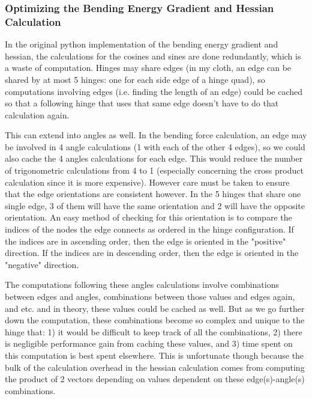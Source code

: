 \documentclass[letterpaper, 10 pt, conference]{ieeeconf}  %
\begin{document}
        \subsubsection{Optimizing the Bending Energy Gradient and Hessian Calculation}
        In the original python implementation of the bending energy gradient and hessian, the calculations for the cosines and sines are done redundantly, which is a waste of computation. Hinges may share edges (in my cloth, an edge can be shared by at most 5 hinges: one for each side edge of a hinge quad), so computations involving edges (i.e. finding the length of an edge) could be cached so that a following hinge that uses that same edge doesn't have to do that calculation again. 

        This can extend into angles as well. In the bending force calculation, an edge may be involved in 4 angle calculations (1 with each of the other 4 edges), so we could also cache the 4 angles calculations for each edge. This would reduce the number of trigonometric calculations from 4 to 1 (especially concerning the cross product calculation since it is more expensive). However care must be taken to ensure that the edge orientations are consistent however. In the 5 hinges that share one single edge, 3 of them will have the same orientation and 2 will have the opposite orientation. An easy method of checking for this orientation is to compare the indices of the nodes the edge connects as ordered in the hinge configuration. If the indices are in ascending order, then the edge is oriented in the "positive" direction. If the indices are in descending order, then the edge is oriented in the "negative" direction.

        The computations following these angles calculations involve combinations between edges and angles, combinations between those values and edges again, and etc. and in theory, these values could be cached as well. But as we go further down the computation, these combinations become so complex and unique to the hinge that: 1) it would be difficult to keep track of all the combinations, 2) there is negligible performance gain from caching these values, and 3) time spent on this computation is best spent elsewhere. This is unfortunate though because the bulk of the calculation overhead in the hessian calculation comes from computing the product of 2 vectors depending on values dependent on these edge(s)-angle(s) combinations.
\end{document}
